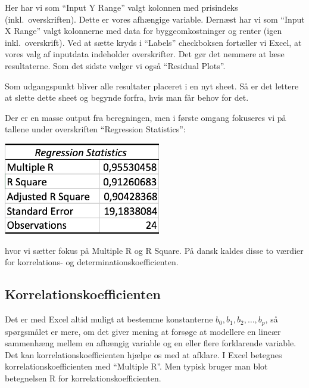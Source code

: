 Her har vi som ``Input Y Range'' valgt kolonnen med prisindeks (inkl.\ overskriften). Dette er vores afhængige variable. Dernæst har vi som ``Input X Range'' valgt kolonnerne med data for byggeomkostninger og renter (igen inkl.\ overskrift). Ved at sætte kryds i ``Labels'' checkboksen fortæller vi Excel, at vores valg af inputdata indeholder overskrifter. Det gør det nemmere at læse resultaterne. Som det sidste vælger vi også ``Residual Plots''.

Som udgangspunkt bliver alle resultater placeret i en nyt sheet. Så er det lettere at slette dette sheet og begynde forfra, hvis man får behov for det.

Der er en masse output fra beregningen, men i første omgang fokuseres vi på tallene under overskriften ``Regression Statistics'':
\begin{center}\label{tabel:resultat}
\includegraphics[height=4cm]{resultat.JPG}
\end{center}
hvor vi sætter fokus på Multiple R og R Square. På dansk kaldes disse to værdier for korrelations- og determinationskoefficienten.

\subsection{Korrelationskoefficienten}
Det er med Excel altid muligt at bestemme konstanterne \(b_0,b_1,b_2,\ldots,b_p\), så spørgsmålet er mere, om det giver mening at forsøge at modellere en lineær sammenhæng mellem en afhængig variable og en eller flere forklarende variable. Det kan korrelationskoefficienten hjælpe os med at afklare. I Excel betegnes korrelationskoefficienten med ``Multiple R''. Men typisk bruger man blot betegnelsen R for korrelationskoefficienten.

